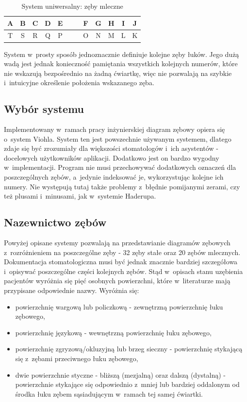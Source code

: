 \begin{table}[h t]
\centering
\begin{tabular}{c c c c c c | c c c c c c}
A & B & C & D & E &&& F & G & H & I & J
\\ [1ex] \hline \rule{0pt}{1.2\normalbaselineskip}
T & S & R & Q & P &&& O & N & M & L & K
\end{tabular}
\caption{\label{tab:tab10} System uniwersalny: zęby mleczne}
\end{table}

System w~prosty sposób jednoznacznie definiuje kolejne zęby łuków. Jego dużą wadą jest jednak konieczność pamiętania wszystkich kolejnych numerów, które nie wskazują bezpośrednio na żadną ćwiartkę, więc nie pozwalają na szybkie i~intuicyjne określenie położenia wskazanego zęba.

\renewcommand*{\tablename}{Tabela}

\subsection{Wybór systemu}

Implementowany w~ramach pracy inżynierskiej diagram zębowy opiera się o~system Viohla. System ten jest powszechnie używanym systemem, dlatego zdaje się być zrozumiały dla większości stomatologów i~ich asystentów - docelowych użytkowników aplikacji. Dodatkowo jest on bardzo wygodny w~implementacji. Program nie musi przechowywać dodatkowych oznaczeń dla poszczególnych zębów, a~jedynie indeksować je, wykorzystując kolejne ich numery. Nie występują tutaj także problemy z~błędnie pomijanymi zerami, czy też plusami i~minusami, jak w~systemie Haderupa.



\subsection{Nazewnictwo zębów}
Powyżej opisane systemy pozwalają na przedstawianie diagramów zębowych z~rozróżnieniem na poszczególne zęby - 32 zęby stałe oraz 20 zębów mlecznych. Dokumentacja stomatologiczna musi być jednak znacznie bardziej szczegółowa i~opisywać poszczególne części kolejnych zębów. Stąd w~opisach stanu uzębienia pacjentów wyróżnia się pięć osobnych powierzchni, które w~literaturze mają przypisane odpowiednie nazwy.\cite{teethAnatomy} Wyróżnia się:

\begin{itemize}
    \item powierzchnię wargową lub policzkową - zewnętrzną powierzchnię łuku zębowego,
    \item powierzchnię językową - wewnętrzną powierzchnię łuku zębowego,
    \item powierzchnię zgryzową/okluzyjną lub brzeg sieczny - powierzchnię stykającą się z~zębami przeciwnego łuku zębowego,
    \item dwie powierzchnie styczne - bliższą (mezjalną) oraz dalszą (dystalną) - powierzchnie stykające się odpowiednio z~mniej lub bardziej oddalonym od środka łuku zębem sąsiadującym w~ramach tej samej ćwiartki.
\end{itemize}



